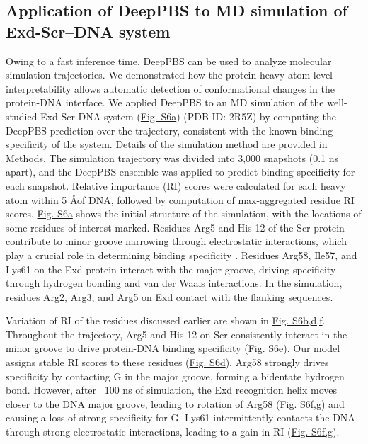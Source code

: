 \subsection{Application of DeepPBS to MD simulation of Exd-Scr–DNA system}

Owing to a fast inference time, DeepPBS can be used to analyze molecular simulation trajectories. We demonstrated how the protein heavy atom-level interpretability allows automatic detection of conformational changes in the protein-DNA interface. We applied DeepPBS to an MD simulation of the well-studied Exd-Scr-DNA system (\hyperref[fig:pdnaS6]{Fig. S6a}) (PDB ID: 2R5Z)\citep{Abe2015, Chiu2022, Ghoshdastidar2022, Slattery2011} by computing the DeepPBS prediction over the trajectory, consistent with the known binding specificity \citep{Abe2015} of the system. Details of the simulation method are provided in Methods. The
simulation trajectory was divided into 3,000 snapshots (0.1 ns apart), and the DeepPBS ensemble was applied to predict binding specificity for each snapshot. Relative importance (RI) scores were calculated for each heavy atom within 5 \AA  of DNA, followed by computation of max-aggregated residue RI scores. \hyperref[fig:pdnaS6]{Fig. S6a} shows the initial structure of the simulation, with the locations of some residues of interest marked. Residues Arg5 and His-12 of the Scr protein contribute to minor groove narrowing through electrostatic interactions, which play a crucial role in determining binding specificity \citep{Joshi2007}. 
Residues Arg58, Ile57, and Lys61 on the Exd protein interact with the major groove, driving specificity through hydrogen bonding and van der Waals interactions. In the simulation, residues Arg2, Arg3, and Arg5 on Exd contact with the flanking sequences. 

Variation of RI of the residues discussed earlier are shown in \hyperref[fig:pdnaS6]{Fig. S6b,d,f}. Throughout the trajectory, Arg5 and His-12 on Scr consistently interact in the minor groove to drive protein-DNA binding specificity (\hyperref[fig:pdnaS6]{Fig. S6e}). Our model assigns stable RI scores to these residues (\hyperref[fig:pdnaS6]{Fig. S6d}). Arg58 strongly drives specificity by contacting G in the major groove, forming a bidentate hydrogen bond. However, after ~100 ns of simulation, the Exd recognition helix moves closer to the DNA major groove, leading to rotation of Arg58 (\hyperref[fig:pdnaS6]{Fig. S6f,g}) and causing a loss of strong specificity for G. Lys61 intermittently contacts the DNA through strong electrostatic interactions, leading to a gain in RI (\hyperref[fig:pdnaS6]{Fig. S6f,g}). 

